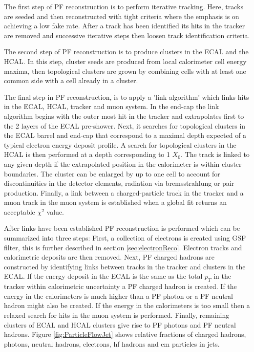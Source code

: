 The first step of PF reconstruction is to perform
iterative tracking. Here, tracks are seeded and then reconstructed with tight criteria
where the emphasis is on achieving a low fake rate. 
After a track has been identified its hits in the tracker are removed and successive iterative steps
then loosen track identification criteria.

The second step of PF reconstruction is to produce clusters in the ECAL and the HCAL. 
In this step, cluster seeds are produced from local calorimeter cell energy maxima, 
then topological clusters are grown by combining cells with at least one common side
with a cell already in a cluster. 

The final step in PF reconstruction, is to apply a 'link algorithm' which links
hits in the ECAL, HCAL, tracker and muon system. In the end-cap the link algorithm
begins with the outer most hit in the tracker and extrapolates
first to the 2 layers of the ECAL pre-shower. Next, it searches for topological clusters
in the ECAL barrel and end-cap that correspond to a maximal depth expected of a typical
electron energy deposit profile. A search for topological clusters in the
HCAL is then performed at a depth corresponding to 1 $X_{0}$.
The track is linked to any given depth if the extrapolated position in 
the calorimeter is within cluster boundaries. The cluster can be enlarged by up 
to one cell to account for discontinuities in the detector elements, radiation via
bremsstrahlung or pair production. Finally, a link between a charged-particle
track in the tracker and a muon track in the muon system is established
when a global fit returns an acceptable $\chi^{2}$ value.

After links have been established PF reconstruction is performed which
can be summarized into three steps: First, a collection of electrons is created using GSF filter,
this is further described in section \ref{sec:electronReco}. Electron
 tracks and calorimetric deposits are then removed. Next, 
PF charged hadrons are constructed by identifying links between tracks in the 
tracker and clusters in the ECAL. If the energy deposit in the ECAL is 
the same as the total $p_{T}$ in the tracker within calorimetric uncertainty a 
PF charged hadron is created. If the energy in the calorimeters is much higher
than a PF photon or a PF neutral hadron might also be created. If the energy in 
the calorimeters is too small then a relaxed search for hits in the muon system
is performed. Finally, remaining clusters of ECAL and HCAL clusters give rise
to PF photons and PF neutral hadrons. Figure \ref{fig:ParticleFlowJet} %
shows relative fractions of charged hadrons, photons, neutral hadrons, electrons,
hf hadrons and em particles in jets.

